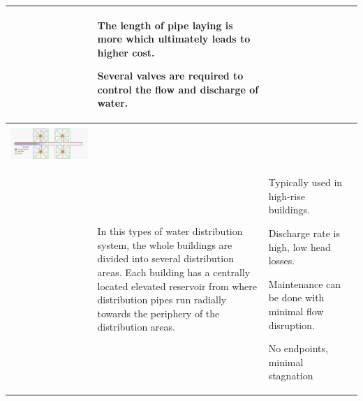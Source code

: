 \documentclass{article}
\begin{document}
\begin{table}[H]
\begin{tabular}{ | c m{4cm} | m{3.1cm} |  m{3.1cm} |}
\begin{itemize}[leftmargin=*]
      \end{itemize}
     & 
       \begin{itemize}[leftmargin=*]
      \scriptsize{
        \item The length of pipe laying is more which ultimately leads to higher cost.
        \item Several valves are required to control the flow and discharge of water.}
      \end{itemize}
    \\ \hline
    \begin{minipage}{.3\textwidth}
    \scriptsize{\textbf{Radial Distribution System}}\\
    \includegraphics[scale=0.15]{RadialDistributionSystem}\\
    \end{minipage}
    &
  \scriptsize{In this types of water distribution system, the whole buildings are divided into several distribution areas. Each building has a centrally located elevated reservoir from where distribution pipes run radially towards the periphery of the distribution areas.}  
    &
    \vspace{0.2cm}
      \begin{itemize}[leftmargin=*]
      \scriptsize{
        \item Typically used in high-rise buildings.
        \item Discharge rate is high, low head losses.
        \item Maintenance can be done with minimal flow disruption.
        \item No endpoints, minimal stagnation}
      \end{itemize}
    & 

\end{tabular}
\end{table}
\end{document}
